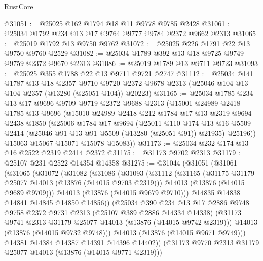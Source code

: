 \begin{lexlean}{RustCore}
\begin{coremodule}
@31051 := @25025 @162 @1794 @18 @11 @9778 @9785 @2428
@31061 := @25034 @1792 @234 @13 @17 @9764 @9777 @9784 @2372 @9662 @2313
@31065 := @25019 @1792 @13 @9750 @9762
@31072 := @25025 @226 @1791 @22 @13 @9750 @9760 @2529
@31082 := @25034 @1789 @392 @13 @18 @9725 @9749 @9759 @2372 @9670 @2313
@31086 := @25019 @1789 @13 @9711 @9723
@31093 := @25025 @355 @1788 @22 @13 @9711 @9721 @2747
@31112 := @25034
    @141
    @1787
    @13
    @18
    @2357
    @9710
    @9720
    @2372
    @9678
    @2313
    (@25046 @104 @13 @104 @2357 (@13280 (@25051 @104)) @20223)
@31165 := @25034
    @1785
    @234
    @13
    @17
    @9696
    @9709
    @9719
    @2372
    @9688
    @2313
    (@15001
      @24989
      @2418
      @1785
      @13
      @9696
      (@15010
        @24989
        @2418
        @212
        @1784
        @17
        @13
        @2319
        @9694
        @2438
        @1850
        (@25006
          @1784
          @17
          @9694
          (@25011
            @110
            @174
            @13
            @16
            @5509
            @2414
            (@25046 @91 @13 @91 @5509 (@13280 (@25051 @91)) @21935)
            @25196))
        @15063
        @15067
        @15071
        @15078
        @15083))
@31173 := @25034 @232 @174 @13 @16 @2522 @2319 @2414 @2372
@31175 := @31173 @9702 @2313
@31179 := @25107 @231 @2522 @14354 @14358
@31275 := @31044
    (@31051
      (@31061
        (@31065
          (@31072
            (@31082
              (@31086
                (@31093
                  (@31112
                    (@31165
                      (@31175 @31179 @25077 @14013 (@13876 (@14015 @9703 @2319)))
                      @14013
                      (@13876 (@14015 @9689 @9709)))
                    @14013
                    (@13876 (@14015 @9679 @9710)))
                  @14835
                  @14838
                  @14841
                  @14845
                  @14850
                  @14856))
              (@25034
                @390
                @234
                @13
                @17
                @2886
                @9748
                @9758
                @2372
                @9731
                @2313
                (@25107 @389 @2886 @14334 @14338)
                (@31173 @9741 @2313 @31179 @25077 @14013 (@13876 (@14015 @9742 @2319)))
                @14013
                (@13876 (@14015 @9732 @9748)))
              @14013
              (@13876 (@14015 @9671 @9749)))
            @14381
            @14384
            @14387
            @14391
            @14396
            @14402))
        (@31173 @9770 @2313 @31179 @25077 @14013 (@13876 (@14015 @9771 @2319)))

\end{coremodule}
\end{lexlean}
